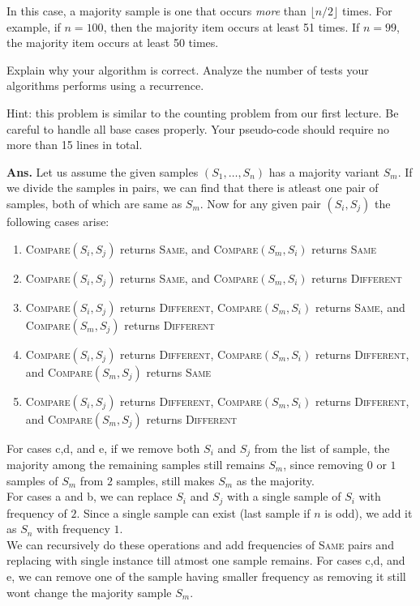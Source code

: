 \documentclass[11pt]{article}
\begin{document}
In this case, a majority sample is one that occurs \emph{more} than $\lfloor n/2 \rfloor$ times. For example, if $n=100$, then the majority item occurs at least 51 times.  If $n=99$, the majority item occurs at least 50 times.

Explain why your algorithm is correct. Analyze the number of tests your algorithms performs using a recurrence.

Hint: this problem is similar to the counting problem from our first lecture. Be careful to handle all base cases properly. Your pseudo-code should require no more than 15 lines in total.
\hfill

\noindent \textbf{Ans.} Let us assume the given samples $(S_1,\ldots,S_n)$ has a majority variant $S_m$. If we divide the samples in pairs, we can find that there is atleast one pair of samples, both of which are same as $S_m$. Now for any given pair $(S_i, S_j)$ the following cases arise:
\begin{enumerate}
    \item \textsc{Compare}$(S_i,S_j)$ returns \textsc{Same}, and \textsc{Compare}$(S_m,S_i)$ returns \textsc{Same}
    \item \textsc{Compare}$(S_i,S_j)$ returns \textsc{Same}, and \textsc{Compare}$(S_m,S_i)$ returns \textsc{Different}
    \item \textsc{Compare}$(S_i,S_j)$ returns \textsc{Different}, \textsc{Compare}$(S_m,S_i)$ returns \textsc{Same}, and \textsc{Compare}$(S_m,S_j)$ returns \textsc{Different}
    \item \textsc{Compare}$(S_i,S_j)$ returns \textsc{Different}, \textsc{Compare}$(S_m,S_i)$ returns \textsc{Different}, and \textsc{Compare}$(S_m,S_j)$ returns \textsc{Same}
    \item \textsc{Compare}$(S_i,S_j)$ returns \textsc{Different}, \textsc{Compare}$(S_m,S_i)$ returns \textsc{Different}, and \textsc{Compare}$(S_m,S_j)$ returns \textsc{Different}
\end{enumerate}
For cases c,d, and e, if we remove both $S_i$ and $S_j$ from the list of sample, the majority among the remaining samples still remains $S_m$, since removing $0$ or $1$ samples of $S_m$ from $2$ samples, still makes $S_m$ as the majority.\\
For cases a and b, we can replace $S_i$ and $S_j$ with a single sample of $S_i$ with frequency of $2$. Since a single sample can exist (last sample if $n$ is odd), we add it as $S_n$ with frequency $1$.\\
We can recursively do these operations and add frequencies of \textsc{Same} pairs and replacing with single instance till atmost one sample remains. For cases c,d, and e, we can remove one of the sample having smaller frequency as removing it still wont change the majority sample $S_m$. 
\end{document}
